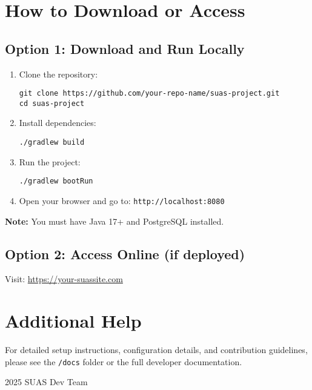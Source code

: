 \documentclass{article}
\begin{document}
\section{How to Download or Access}
\subsection*{Option 1: Download and Run Locally}
\begin{enumerate}
    \item Clone the repository:
    \begin{lstlisting}
git clone https://github.com/your-repo-name/suas-project.git
cd suas-project
    \end{lstlisting}

    \item Install dependencies:
    \begin{lstlisting}
./gradlew build
    \end{lstlisting}

    \item Run the project:
    \begin{lstlisting}
./gradlew bootRun
    \end{lstlisting}

    \item Open your browser and go to: \texttt{http://localhost:8080}
\end{enumerate}

\textbf{Note:} You must have Java 17+ and PostgreSQL installed.

\subsection*{Option 2: Access Online (if deployed)}
Visit: \href{https://your-suassite.com}{https://your-suassite.com}

\section{Additional Help}
For detailed setup instructions, configuration details, and contribution guidelines, please see the \texttt{/docs} folder or the full developer documentation.

\bigskip
\noindent
\textcopyright{}
2025 SUAS Dev Team
\end{document}
